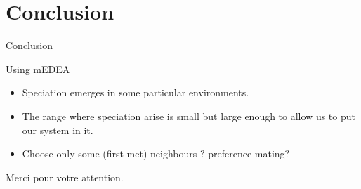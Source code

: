 \documentclass[8pt, handout=show,notes=show]{beamer}
\begin{document}
\section{Conclusion}

\begin{frame}{Conclusion}
	\begin{block}{Using mEDEA}
		\begin{itemize}
			\item Speciation emerges in some particular environments.
			\item The range where speciation arise is small but large enough to allow us to put our system in it.
			\item Choose only some (first met) neighbours ? preference mating? 
		\end{itemize}
	\end{block}
\end{frame}

\begin{frame}%
\begin{center}
Merci pour votre attention.
\end{center}
\end{frame}
\end{document}
